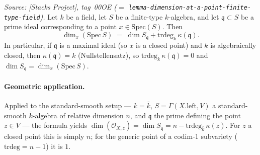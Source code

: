 \begin{lemma}
  \label{lem:smooth_algebra_krull_dim_formula}
  \textit{Source: [Stacks Project], tag~00OE (\(=\) \texttt{lemma-dimension-at-a-point-finite-type-field}).}
  Let \(k\) be a field, let \(S\) be a finite-type \(k\)-algebra, and let
  \(\mathfrak q \subset S\) be a prime ideal corresponding to a point
  \(x \in \mathrm{Spec}(S)\). Then
  \[
    \dim_x(\mathrm{Spec}\,S)
    \;=\; \dim S_{\mathfrak q} + \mathrm{trdeg}_k\,\kappa(\mathfrak q).
  \]
  In particular, if \(\mathfrak q\) is a maximal ideal (so \(x\) is a
  closed point) and \(k\) is algebraically closed, then
  \(\kappa(\mathfrak q) = k\) (Nullstellensatz), so
  \(\mathrm{trdeg}_k\,\kappa(\mathfrak q) = 0\) and
  \(\dim S_{\mathfrak q} = \dim_x(\mathrm{Spec}\,S)\).

  \paragraph{Geometric application.} Applied to the standard-smooth
  setup --- \(k = \bar k\), \(S = \Gamma(X.\mathrm{left}, V)\) a
  standard-smooth \(\bar k\)-algebra of relative dimension \(n\),
  and \(\mathfrak q\) the prime defining the point \(z \in V\) --- the
  formula yields \(\dim(\mathcal O_{X, z}) = \dim S_{\mathfrak q} = n -
  \mathrm{trdeg}_{\bar k}\,\kappa(z)\). For \(z\) a closed point this is
  simply \(n\); for the generic point of a codim-\(1\) subvariety
  (\(\mathrm{trdeg} = n - 1\)) it is \(1\).
\end{lemma}


